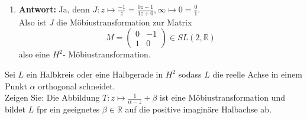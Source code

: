 \begin{solution}
\begin{enumerate}[label= (\alph*)]
    \item \textbf{Antwort:} Ja, denn \( J: z \mapsto \frac{-1}{z} = \frac{0z - 1}{1z + 0}, \infty \mapsto 0 = \frac{0}{1} \). \\
    Also ist \( J \) die Möbiustransformation zur Matrix
    \begin{equation*}
      M = \begin{pmatrix}
        0 & -1 \\
        1 & 0 
      \end{pmatrix} \in SL(2,\mathbb{R})
    \end{equation*}
    also eine \( H^2 \)- Möbiustransformation.
  \end{enumerate} 
\end{solution}

\begin{assignment}
  Sei \( L \) ein Halbkreis oder eine Halbgerade in \( H^2\) sodass \( L \) die reelle Achse in einem Punkt \( \alpha \) orthogonal schneidet. \\
  Zeigen Sie: Die Abbildung \( T: z \mapsto \frac{1}{\alpha - z} + \beta \) ist eine Möbiustransformation und bildet \( L \) fpr ein geeignetes \( \beta \in \mathbb{R}\) auf die positive imaginäre Halbachse ab.
\end{assignment}
